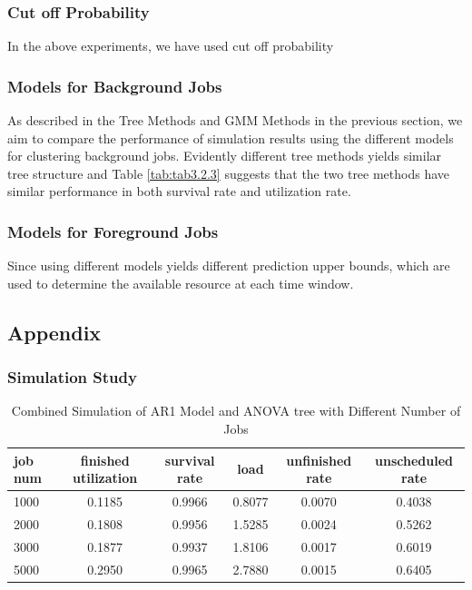 \documentclass{article}
\begin{document}
\subsubsection{Cut off Probability}

\begin{flushleft}
In the above experiments, we have used cut off probability 
\end{flushleft}

\subsubsection{Models for Background Jobs}

\begin{flushleft}
As described in the Tree Methods and GMM Methods in the previous section, we aim
to compare the performance of simulation results using the different models for
clustering background jobs. Evidently different tree methods yields similar tree
structure and Table \ref{tab:tab3.2.3} suggests that the two tree methods have
similar performance in both survival rate and utilization rate.
\end{flushleft}

\subsubsection{Models for Foreground Jobs}
Since using different models yields different prediction upper bounds, which are
used to determine the available resource at each time window.

\subsection{Appendix}

\subsubsection{Simulation Study}

\begin{longtable}[htbp]{l|*{5}{c}} 
  \caption{Combined Simulation of AR1 Model and ANOVA tree with Different Number of Jobs}
  \label{tab:tab3.2.1} \\
  \textbf{job num} & \textbf{finished utilization} & \textbf{survival rate} &
  \textbf{load} & \textbf{unfinished rate} & \textbf{unscheduled rate} \\
  \hline
  1000 & 0.1185 & 0.9966 & 0.8077 & 0.0070 & 0.4038\\
  2000 & 0.1808 & 0.9956 & 1.5285 & 0.0024 & 0.5262\\
  3000 & 0.1877 & 0.9937 & 1.8106 & 0.0017 & 0.6019\\
  5000 & 0.2950 & 0.9965 & 2.7880 & 0.0015 & 0.6405\\
\end{longtable}
\end{document}
